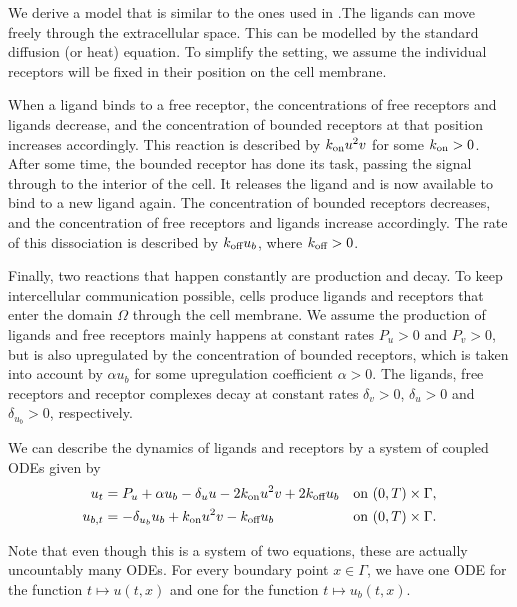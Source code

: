 We derive a model that is similar to the ones used in \cite{iber2014}.The ligands can move freely through the extracellular space. This can be modelled by the standard diffusion (or heat) equation. To simplify the setting, we assume the individual receptors will be fixed in their position on the cell membrane.

When a ligand binds to a free receptor, the concentrations of free receptors and ligands decrease, and the concentration of bounded receptors at that position increases accordingly. This reaction is described by $k_\text{on} u^2 v$ for some $k_\text{on} > 0$. After some time, the bounded receptor has done its task, passing the signal through to the interior of the cell. It releases the ligand and is now available to bind to a new ligand again. The concentration of bounded receptors decreases, and the concentration of free receptors and ligands increase accordingly. The rate of this dissociation is described by $k_\text{off} u_b$, where $k_\text{off} > 0$.

Finally, two reactions that happen constantly are production and decay. To keep intercellular communication possible, cells produce ligands and receptors that enter the domain $\Omega$ through the cell membrane. We assume the production of ligands and free receptors mainly happens at constant rates $P_u > 0$ and $P_v > 0$, but is also upregulated by the concentration of bounded receptors, which is taken into account by $\alpha u_b$ for some upregulation coefficient $\alpha > 0$. The ligands, free receptors and receptor complexes decay at constant rates $\delta_v > 0$, $\delta_u > 0$ and $\delta_{u_b} > 0$, respectively.

We can describe the dynamics of ligands and receptors by a system of coupled ODEs given by
%
\begin{equation}
    \label{sys:ODEs}
    \begin{aligned}
        u_t         &= P_u + \alpha u_b - \delta_u u - 2 k_\text{on} u^2 v + 2 k_\text{off} u_b   & \text{on }& (0, T) \times \Gamma, \\
        u_{b,t}     &= -\delta_{u_b} u_b + k_\text{on} u^2 v - k_\text{off} u_b                   & \text{on }& (0, T) \times \Gamma. \\
    \end{aligned}
\end{equation}

\noindent
Note that even though this is a system of two equations, these are actually uncountably many ODEs. For every boundary point $x \in \Gamma$, we have one ODE for the function $t \mapsto u(t, x)$ and one for the function $t \mapsto u_b(t, x)$.

